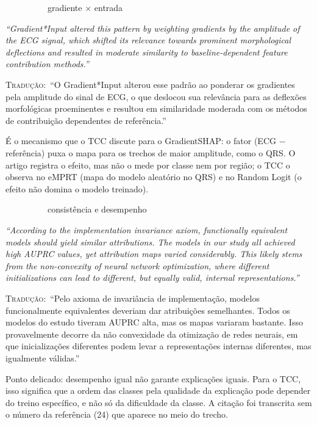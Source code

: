 \documentclass[11pt,a4paper]{article}
\newcommand{\pagechip}[1]{{\setlength{\fboxsep}{1.5pt}\colorbox{cAcc}{\textcolor{white}{\scriptsize\texttt{#1}}}}}
\newenvironment{origquote}{\par\itshape\small}{\par}
\newenvironment{tradquote}{\par\small\textsc{Tradução:}\ }{\par}
\newcommand{\explab}[1]{\par\smallskip{\small\color{cAcc}\textbf{\MakeUppercase{#1}}}\par}
\begin{document}
\begin{citacard}{\pagechip{Discussão} gradiente $\times$ entrada}
\begin{origquote}“Gradient*Input altered this pattern by weighting gradients by the amplitude of the ECG signal, which shifted its relevance towards prominent morphological deflections and resulted in moderate similarity to baseline-dependent feature contribution methods.”\end{origquote}
\begin{tradquote}“O Gradient*Input alterou esse padrão ao ponderar os gradientes pela amplitude do sinal de ECG, o que deslocou sua relevância para as deflexões morfológicas proeminentes e resultou em similaridade moderada com os métodos de contribuição dependentes de referência.”\end{tradquote}
\explab{Explicação}
É o mecanismo que o TCC discute para o GradientSHAP: o fator (ECG $-$ referência) puxa o mapa para os trechos de maior amplitude, como o QRS. O artigo registra o efeito, mas não o mede por classe nem por região; o TCC o observa no eMPRT (mapa do modelo aleatório no QRS) e no Random Logit (o efeito não domina o modelo treinado).
\end{citacard}

\begin{citacard}{\pagechip{Discussão} consistência e desempenho}
\begin{origquote}“According to the implementation invariance axiom, functionally equivalent models should yield similar attributions. The models in our study all achieved high AUPRC values, yet attribution maps varied considerably. This likely stems from the non-convexity of neural network optimization, where different initializations can lead to different, but equally valid, internal representations.”\end{origquote}
\begin{tradquote}“Pelo axioma de invariância de implementação, modelos funcionalmente equivalentes deveriam dar atribuições semelhantes. Todos os modelos do estudo tiveram AUPRC alta, mas os mapas variaram bastante. Isso provavelmente decorre da não convexidade da otimização de redes neurais, em que inicializações diferentes podem levar a representações internas diferentes, mas igualmente válidas.”\end{tradquote}
\explab{Explicação}
Ponto delicado: desempenho igual não garante explicações iguais. Para o TCC, isso significa que a ordem das classes pela qualidade da explicação pode depender do treino específico, e não só da dificuldade da classe. A citação foi transcrita sem o número da referência (24) que aparece no meio do trecho.
\end{citacard}
\end{document}
